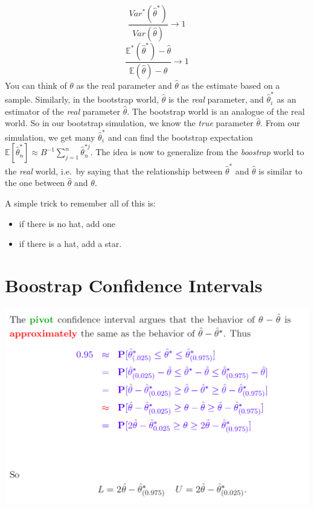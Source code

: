 \documentclass[]{book}
\providecommand{\tightlist}{%
  \setlength{\itemsep}{0pt}\setlength{\parskip}{0pt}}
\begin{document}
\[ \frac{Var^* (\hat{\theta}^*)}{Var(\hat{\theta})} \rightarrow 1\]
\[ \frac{\mathbb{E}^* (\hat{\theta}^*) - \hat{\theta}}{\mathbb{E}(\hat{\theta}) - \theta} \rightarrow 1\]
You can think of \(\theta\) as the real parameter and \(\hat{\theta}\)
as the estimate based on a sample. Similarly, in the bootstrap world,
\(\hat{\theta}\) is the \emph{real} parameter, and \(\hat{\theta}^*_i\)
as an estimator of the \emph{real} parameter \(\hat{\theta}\). The
bootstrap world is an analogue of the real world. So in our bootstrap
simulation, we know the \emph{true} parameter \(\hat{\theta}\). From our
simulation, we get many \(\hat{\theta}^*_i\) and can find the bootstrap
expectation
\(\mathbb{E}[\hat{\theta}^*_n] \approx B^{-1}\sum\limits_{j = 1}^n \hat{\theta}^{* j}_n\).
The idea is now to generalize from the \emph{boostrap} world to the
\emph{real} world, i.e.~by saying that the relationship between
\(\hat{\theta}^*\) and \(\hat{\theta}\) is similar to the one between
\(\hat{\theta}\) and \(\theta\).

A simple trick to remember all of this is:

\begin{itemize}
\tightlist
\item
  if there is no hat, add one
\item
  if there is a hat, add a star.
\end{itemize}

\section{Boostrap Confidence
Intervals}\label{boostrap-confidence-intervals}

\includegraphics[width=16.08in]{figures/pivot_ci}
\end{document}

